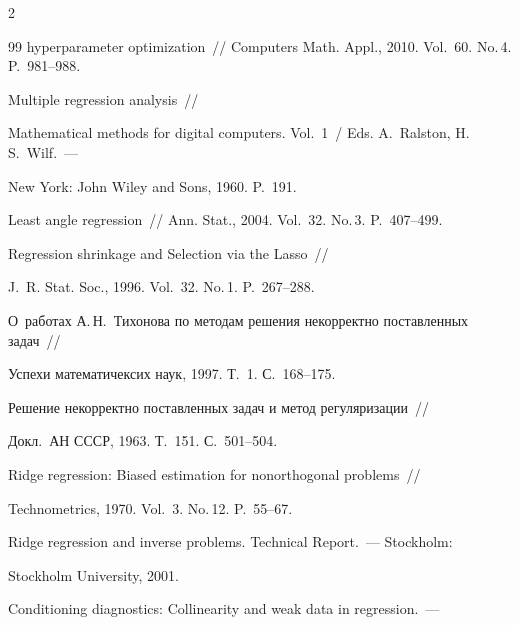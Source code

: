 \begin{multicols}{2}
{{\begin{thebibliography}{99}
hyperparameter optimization~// Computers Math. Appl., 2010. Vol.~60. No.\,4. P.~981--988.




 Multiple regression analysis~// 

Mathematical methods for digital computers. Vol.~1~/ Eds. A.~Ralston, H.\,S.~Wilf.~--- 

New York: John Wiley and Sons, 1960. P.~191.





Least angle regression~// Ann. Stat., 2004. Vol.~32. No.\,3. P.~407--499.




 Regression shrinkage and Selection via the Lasso~//

J.~R. Stat. Soc., 1996. Vol.~32. No.\,1.  P.~267--288.




 О~работах А.\,Н.~Тихонова по методам решения некорректно поставленных задач~//

Успехи математичексих наук, 1997. Т.~1. С.~168--175.




 Решение некорректно поставленных задач и метод регуляризации~//

Докл.\ АН СССР, 1963. Т.~151. С.~501--504.




 Ridge regression: Biased estimation for nonorthogonal problems~//

Technometrics, 1970. Vol.~3. No.\,12. P.~55--67.




 Ridge regression and inverse problems. Technical Report.~--- Stockholm: 

Stockholm University, 2001.




 Conditioning diagnostics: Collinearity and weak data in regression.~--- 


\end{thebibliography}}}
\end{multicols}
